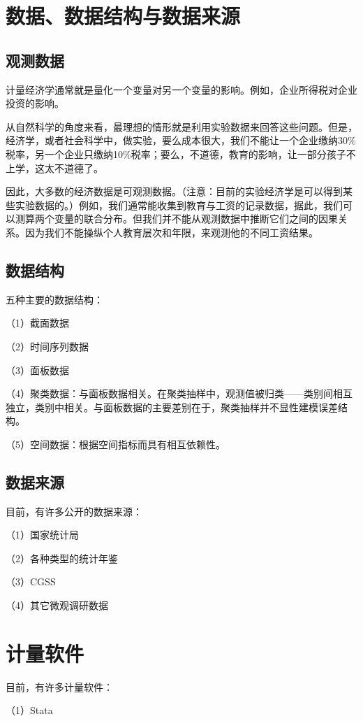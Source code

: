\documentclass[cn,10pt,math=newtx,citestyle=gb7714-2015,bibstyle=gb7714-2015]{elegantbook}
\begin{document}
	\section{数据、数据结构与数据来源}
	\subsection{观测数据}
	\begin{flushleft}
		计量经济学通常就是量化一个变量对另一个变量的影响。例如，企业所得税对企业投资的影响。
		
		从自然科学的角度来看，最理想的情形就是利用实验数据来回答这些问题。但是，经济学，或者社会科学中，做实验，要么成本很大，我们不能让一个企业缴纳30\%税率，另一个企业只缴纳10\%税率；要么，不道德，教育的影响，让一部分孩子不上学，这太不道德了。
		
		因此，大多数的经济数据是可观测数据。（注意：目前的实验经济学是可以得到某些实验数据的。）例如，我们通常能收集到教育与工资的记录数据，据此，我们可以测算两个变量的联合分布。但我们并不能从观测数据中推断它们之间的因果关系。因为我们不能操纵个人教育层次和年限，来观测他的不同工资结果。
	\end{flushleft}
	\subsection{数据结构}
	五种主要的数据结构：
	
	（1）截面数据
	
	（2）时间序列数据
	
	（3）面板数据
	
	（4）聚类数据：与面板数据相关。在聚类抽样中，观测值被归类——类别间相互独立，类别中相关。与面板数据的主要差别在于，聚类抽样并不显性建模误差结构。
	
	（5）空间数据：根据空间指标而具有相互依赖性。
	
	\subsection{数据来源}
	目前，有许多公开的数据来源：
	
	（1）国家统计局
	
	（2）各种类型的统计年鉴
	
	（3）CGSS
	
	（4）其它微观调研数据
	\section{计量软件}
	目前，有许多计量软件：
	
	（1）Stata
	
\end{document}
